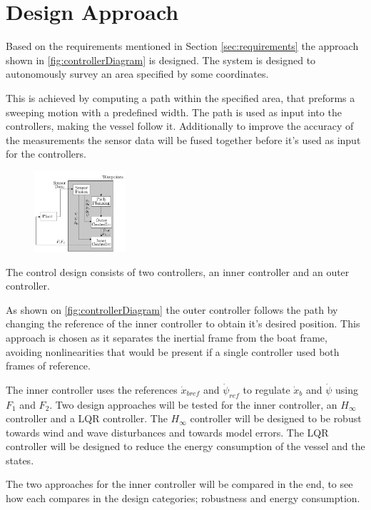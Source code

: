 \chapter{Design Approach}
Based on the requirements mentioned in Section \ref{sec:requirements} the approach shown in \autoref{fig:controllerDiagram} is designed. 
The system is designed to autonomously survey an area specified by some coordinates.

This is achieved by computing a path within the specified area, that preforms a sweeping motion with a predefined width.
The path is used as input into the controllers, making the vessel follow it. 
Additionally to improve the accuracy of the measurements the sensor data will be fused together before it's used as input for the controllers. 
\begin{figure}[H]
    \includegraphics[width=0.3\textwidth]{figures/controllerDiagram2}
    \caption{}
    \label{fig:controllerDiagram}
\end{figure}

The control design consists of two controllers, an inner controller and an outer controller. 

As shown on \autoref{fig:controllerDiagram} the outer controller follows the path by changing the reference of the inner controller to obtain it's desired position. 
This approach is chosen as it separates the inertial frame from the boat frame, avoiding nonlinearities that would be present if a single controller used both frames of reference. 

The inner controller uses the references $\dot{x}_{bref}$ and $\dot{\psi}_{ref}$ to regulate $\dot{x}_{b}$ and $\dot{\psi}$ using $F_{1}$ and $F_{2}$. 
Two design approaches will be tested for the inner controller, an $H_{\infty}$ controller and a LQR controller.
The $H_{\infty}$ controller will be designed to be robust towards wind and wave disturbances and towards model errors. 
The LQR controller will be designed to reduce the energy consumption of the vessel and the states. 

The two approaches for the inner controller will be compared in the end, to see how each compares in the design categories; robustness and energy consumption. 

